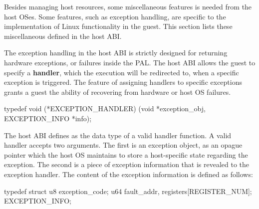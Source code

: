 \label{sec:abi:misc}


Besides managing host resources, 
some miscellaneous features is needed from the host OSes.
Some features, such as exception handling, are specific to the implementation of Linux functionality
in the guest.
This section lists these miscellaneous \hostapis{} defined in the host ABI.






The exception handling in the host ABI
is strictly designed for returning hardware exceptions,
or failures inside the PAL.
The host ABI allows the guest to specify a {\bf handler},
which the execution will be redirected to, when a specific exception is triggered.
The feature of assigning handlers to specific exceptions
grants a guest the ability of recovering from hardware or host OS failures.




\begin{paldef}
typedef void (*EXCEPTION_HANDLER)
            (void *exception_obj, EXCEPTION_INFO *info);
\end{paldef}



The host ABI defines  as the data type of a valid handler function.
A valid handler accepts two arguments.
The first is an exception object, as an opague pointer
which the host OS maintains to store a host-specific state regarding the exception.
The second is a piece of exception information that
is revealed to the exception handler.
The content of the exception information is defined as follows:

\begin{paldef}
typedef struct {
    u8  exception_code;
    u64 fault_addr, registers[REGISTER_NUM];
} EXCEPTION_INFO;
\end{paldef}

